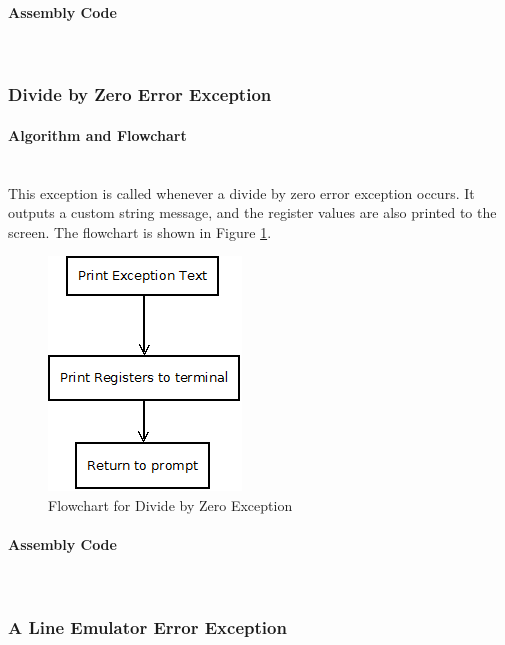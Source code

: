 \documentclass[12pt]{article}
\begin{document}
			\paragraph{Assembly Code}~\\	
						
			
			\subsubsection{Divide by Zero Error Exception}
			\paragraph{Algorithm and Flowchart}~\\
			This exception is called whenever a divide by zero error exception occurs. It outputs a custom string message, and the register values are also printed to the screen. The flowchart is shown in Figure \ref{fig:zero}.
			
			\begin{figure}[H]
				\centering
				\includegraphics[width=0.3\linewidth]{Exception}
				\caption{Flowchart for Divide by Zero Exception}
				\label{fig:zero}
			\end{figure}
			\paragraph{Assembly Code}~\\	
						
			
			\subsubsection{A Line Emulator Error Exception}
\end{document}
